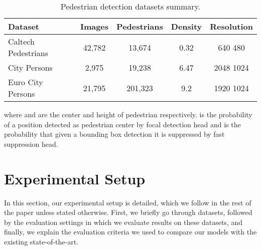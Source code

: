 \documentclass[a4paper,conference]{IEEEtran}
\begin{document}
\begin{table}[!t]
    \renewcommand{\arraystretch}{1.3}
    \caption{Pedestrian detection datasets summary.}
    \label{tab:datasets}
    \centering
    \begin{tabular}{l|c|c|c|c}
         \hline
         Dataset & Images & Pedestrians & Density & Resolution \\
         \hline
         Caltech Pedestrians & 42,782 & 13,674 & 0.32 & 640  480 \\
         \hline
         City Persons & 2,975 & 19,238 & 6.47 & 2048  1024 \\
         \hline
         Euro City Persons & 21,795 & 201,323 & 9.2 & 1920  1024 \\
         \hline
    \end{tabular}
\end{table}

where  and  are the center and height of pedestrian respectively.  is the probability of a position detected as pedestrian center by focal detection head and  is the probability that given a bounding box detection it is suppressed by fast suppression head.
 
\section{Experimental Setup}
In this section, our experimental setup is detailed, which we follow in the rest of the paper unless stated otherwise. First, we briefly go through datasets, followed by the evaluation settings in which we evaluate results on these datasets, and finally, we explain the evaluation criteria we used to compare our models with the existing state-of-the-art.
\end{document}
